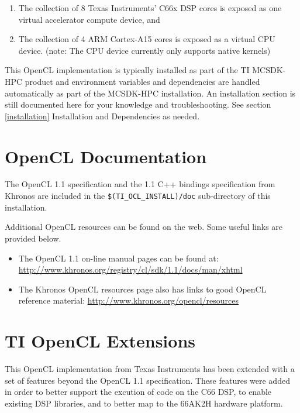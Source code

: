 \documentclass[10pt]{article}
\begin{document}
\begin{enumerate}
\item The collection of 8 Texas Instruments' C66x DSP cores is
exposed as one virtual accelerator compute device, and
\item The collection of 4 ARM 
Cortex-A15 cores is exposed as a virtual CPU device. (note: The CPU device currently only
supports native kernels)
\end{enumerate}

This OpenCL implementation is typically installed as part of the TI MCSDK-HPC product and environment variables and dependencies are handled automatically as part of the MCSDK-HPC installation. An installation section is still documented here for your knowledge and troubleshooting.  See section \ref{installation} Installation and Dependencies as needed.

\section{OpenCL Documentation}

The OpenCL 1.1 specification and the 1.1 C++ bindings specification from
Khronos are included in the \verb!$(TI_OCL_INSTALL)/doc! sub-directory of this
installation.

Additional OpenCL resources can be found on the web.  Some useful links are provided
below.

\begin{itemize}
\item The OpenCL 1.1 on-line manual pages can be found at:
    \url{http://www.khronos.org/registry/cl/sdk/1.1/docs/man/xhtml}

\item The Khronos OpenCL resources page also has links to good OpenCL
reference material: \url{http://www.khronos.org/opencl/resources}
\end{itemize}




\section{TI OpenCL Extensions}

This OpenCL implementation from Texas Instruments has been extended with a set
of features beyond the OpenCL 1.1 specification.  These features were added in
order to better support the excution of code on the C66 DSP, to enable
existing DSP libraries, and to better map to the 66AK2H hardware platform.
\end{document}
